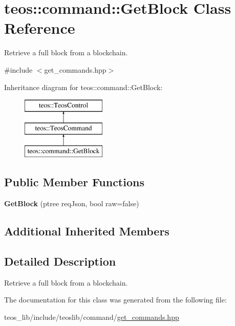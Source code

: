 \hypertarget{classteos_1_1command_1_1_get_block}{}\section{teos\+:\+:command\+:\+:Get\+Block Class Reference}
\label{classteos_1_1command_1_1_get_block}


Retrieve a full block from a blockchain.  




{\ttfamily \#include $<$get\+\_\+commands.\+hpp$>$}

Inheritance diagram for teos\+:\+:command\+:\+:Get\+Block\+:\begin{figure}[H]
\begin{center}
\leavevmode
\includegraphics[height=3.000000cm]{classteos_1_1command_1_1_get_block}
\end{center}
\end{figure}
\subsection*{Public Member Functions}
\begin{DoxyCompactItemize}
\item 
\mbox{\label{classteos_1_1command_1_1_get_block_a2e422461f3a01ea1f1514f69b3a55fec}} 
{\bfseries Get\+Block} (ptree req\+Json, bool raw=false)
\end{DoxyCompactItemize}
\subsection*{Additional Inherited Members}


\subsection{Detailed Description}
Retrieve a full block from a blockchain. 

The documentation for this class was generated from the following file\+:\begin{DoxyCompactItemize}
\item 
teos\+\_\+lib/include/teoslib/command/\mbox{\hyperlink{get__commands_8hpp}{get\+\_\+commands.\+hpp}}\end{DoxyCompactItemize}

